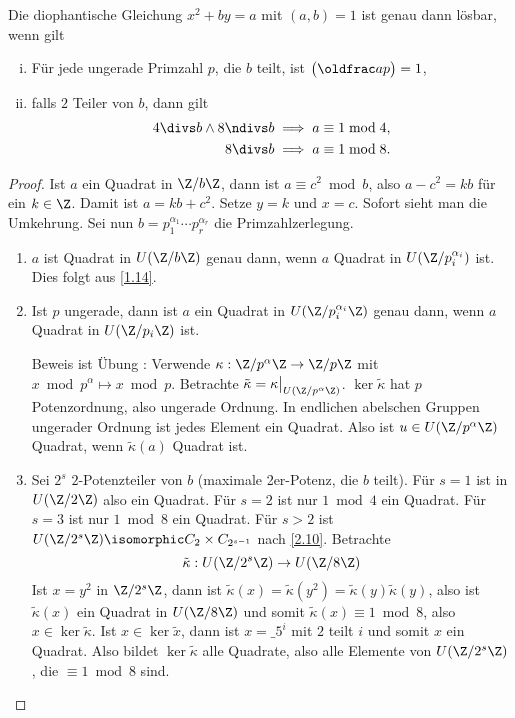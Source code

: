 \begin{st} \label{2.18}
	Die diophantische Gleichung $x^2 + by = a$ mit $(a,b) = 1$ ist genau dann lösbar, wenn gilt
	\begin{enumerate}[i)]
		\item
			Für jede ungerade Primzahl $p$, die $b$ teilt, ist $\legsym ap = 1$,
		\item
			falls $2$ Teiler von $b$, dann gilt
			\begin{align*}
				4 \divs b \land 8 \ndivs b & \implies a \equiv 1 \bmod 4, \\
				8 \divs b & \implies a \equiv 1 \bmod 8.
			\end{align*}
	\end{enumerate}
	\begin{proof}
		Ist $a$ ein Quadrat in $\Z / b\Z$, dann ist $a \equiv c^2 \bmod b$, also $a-c^2 = kb$ für ein $k \in \Z$.
		Damit ist $a = kb + c^2$.
		Setze $y = k$ und $x = c$.
		Sofort sieht man die Umkehrung.
		Sei nun $b = p_1^{\alpha_1} \dotsb p_r^{\alpha_r}$ die Primzahlzerlegung.
		\begin{enumerate}[1)]
			\item
				$a$ ist Quadrat in $U(\Z / b \Z)$ genau dann, wenn $a$ Quadrat in $U(\Z /p_i^{\alpha_i})$ ist.
				Dies folgt aus \ref{1.14}.
			\item
				Ist $p$ ungerade, dann ist $a$ ein Quadrat in $U(\Z / p_i^{\alpha_i} \Z)$ genau dann, wenn $a$ Quadrat in $U(\Z/p_i \Z)$ ist.

				Beweis ist Übung \Exercise: Verwende $\kappa: \Z / p^{\alpha} \Z \to \Z / p \Z$ mit $x \bmod p^\alpha \mapsto x \bmod p$.
				Betrachte $\tilde \kappa = \kappa\big|_{U(\Z / p^{\alpha} \Z)}$.
				$\ker \tilde \kappa$ hat $p$ Potenzordnung, also ungerade Ordnung.
				In endlichen abelschen Gruppen ungerader Ordnung ist jedes Element ein Quadrat.
				Also ist $u \in U(\Z / p^{\alpha} \Z)$ Quadrat, wenn $\tilde \kappa(a)$ Quadrat ist.
			\item
				Sei $2^s$ $2$-Potenzteiler von $b$ (maximale 2er-Potenz, die $b$ teilt).
				Für $s = 1$ ist in $U(\Z / 2\Z)$ also ein Quadrat.
				Für $s = 2$ ist nur $1 \bmod 4$ ein Quadrat.
				Für $s = 3$ ist nur $1 \bmod 8$ ein Quadrat.
				Für $s > 2$ ist $U(\Z / 2^s \Z) \isomorphic C_2 \times C_{2^{s-1}}$ nach \ref{2.10}.
				Betrachte
				\[
					\tilde \kappa: U(\Z / 2^s \Z) \to U(\Z / 8\Z)
				\]
				Ist $x = y^2$ in $\Z / 2^s\Z$, dann ist $\tilde \kappa(x) = \tilde \kappa(y^2) = \tilde \kappa(y) \tilde \kappa(y)$, also ist $\tilde \kappa(x)$ ein Quadrat in $U(\Z / 8\Z)$ und somit $\tilde \kappa(x) \equiv 1 \bmod 8$, also $x \in \ker \tilde \kappa$.
				Ist $x \in \ker \tilde x$, dann ist $x = \_5^i$ mit $2$ teilt $i$ und somit $x$ ein Quadrat.
				Also bildet $\ker \tilde \kappa$ alle Quadrate, also alle Elemente von $U(\Z / 2^s \Z)$, die $\equiv 1 \bmod 8$ sind.
		\end{enumerate}
	\end{proof}
\end{st}







